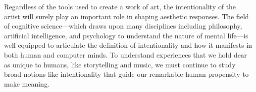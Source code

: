 \documentclass[12pt,twoside]{reedthesis}
\begin{document}
Regardless of the tools used to create a work of art, the intentionality of the artist will surely play an important role in shaping aesthetic responses. The field of cognitive science—which draws upon many disciplines including philosophy, artificial intelligence, and psychology to understand the nature of mental life—is well-equipped to articulate the definition of intentionality and how it manifests in both human and computer minds. To understand experiences that we hold dear as unique to humans, like storytelling and music, we must continue to study broad notions like intentionality that guide our remarkable human propensity to make meaning. 





  \backmatter %

    \nocite{*}


%  
 

\end{document}

